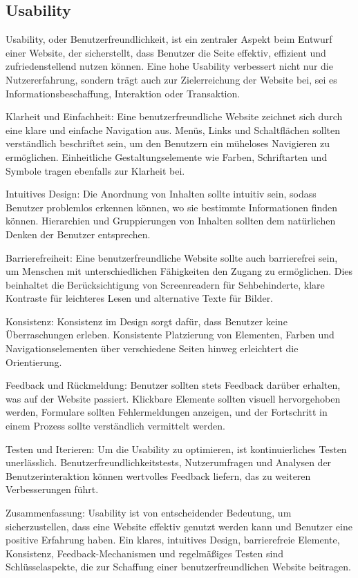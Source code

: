 \documentclass[fontsize=12pt,openright,oneside,paper=a4,BCOR=1cm]{scrbook}
\begin{document}
\subsection{Usability}
Usability, oder Benutzerfreundlichkeit, ist ein zentraler Aspekt beim Entwurf einer Website, der sicherstellt, dass Benutzer die Seite effektiv, effizient und zufriedenstellend nutzen können. Eine hohe Usability verbessert nicht nur die Nutzererfahrung, sondern trägt auch zur Zielerreichung der Website bei, sei es Informationsbeschaffung, Interaktion oder Transaktion.

Klarheit und Einfachheit: Eine benutzerfreundliche Website zeichnet sich durch eine klare und einfache Navigation aus. Menüs, Links und Schaltflächen sollten verständlich beschriftet sein, um den Benutzern ein müheloses Navigieren zu ermöglichen. Einheitliche Gestaltungselemente wie Farben, Schriftarten und Symbole tragen ebenfalls zur Klarheit bei.

Intuitives Design: Die Anordnung von Inhalten sollte intuitiv sein, sodass Benutzer problemlos erkennen können, wo sie bestimmte Informationen finden können. Hierarchien und Gruppierungen von Inhalten sollten dem natürlichen Denken der Benutzer entsprechen.

Barrierefreiheit: Eine benutzerfreundliche Website sollte auch barrierefrei sein, um Menschen mit unterschiedlichen Fähigkeiten den Zugang zu ermöglichen. Dies beinhaltet die Berücksichtigung von Screenreadern für Sehbehinderte, klare Kontraste für leichteres Lesen und alternative Texte für Bilder.

Konsistenz: Konsistenz im Design sorgt dafür, dass Benutzer keine Überraschungen erleben. Konsistente Platzierung von Elementen, Farben und Navigationselementen über verschiedene Seiten hinweg erleichtert die Orientierung.

Feedback und Rückmeldung: Benutzer sollten stets Feedback darüber erhalten, was auf der Website passiert. Klickbare Elemente sollten visuell hervorgehoben werden, Formulare sollten Fehlermeldungen anzeigen, und der Fortschritt in einem Prozess sollte verständlich vermittelt werden.

Testen und Iterieren: Um die Usability zu optimieren, ist kontinuierliches Testen unerlässlich. Benutzerfreundlichkeitstests, Nutzerumfragen und Analysen der Benutzerinteraktion können wertvolles Feedback liefern, das zu weiteren Verbesserungen führt.

Zusammenfassung:
Usability ist von entscheidender Bedeutung, um sicherzustellen, dass eine Website effektiv genutzt werden kann und Benutzer eine positive Erfahrung haben. Ein klares, intuitives Design, barrierefreie Elemente, Konsistenz, Feedback-Mechanismen und regelmäßiges Testen sind Schlüsselaspekte, die zur Schaffung einer benutzerfreundlichen Website beitragen.
\end{document}
